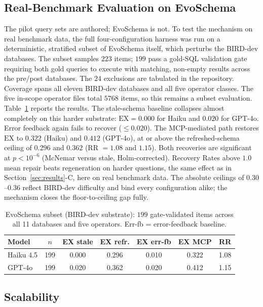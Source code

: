 \documentclass[conference,10pt,a4paper]{IEEEtran}
\begin{document}
\subsection{Real-Benchmark Evaluation on EvoSchema}
\label{sec:evoschema}
The pilot query sets are authored; EvoSchema is not. To test the
mechanism on real benchmark data, the full four-configuration harness
was run on a deterministic, stratified subset of EvoSchema itself,
which perturbs the BIRD-dev databases. The subset samples $223$ items;
$199$ pass a gold-SQL validation gate requiring both gold queries to
execute with matching, non-empty results across the pre/post
databases. The $24$ exclusions are tabulated in the repository.
Coverage spans all eleven BIRD-dev databases and all five operator
classes. The five in-scope operator files total $5768$ items, so this
remains a subset evaluation. Table~\ref{tab:evoschema} reports the
results. The stale-schema baseline collapses almost completely on this
harder substrate: $\text{EX} = 0.000$ for Haiku and $0.020$ for
GPT-4o. Error feedback again fails to recover ($\leq 0.020$). The
MCP-mediated path restores $\text{EX}$ to $0.322$ (Haiku) and $0.412$
(GPT-4o), at or above the refreshed-schema ceiling of $0.296$ and
$0.362$ (RR $= 1.08$ and $1.15$). Both recoveries are significant at
$p < 10^{-6}$ (McNemar versus stale, Holm-corrected). Recovery Rates
above $1.0$ mean repair beats regeneration on harder questions, the
same effect as in Section~\ref{sec:results}-C, here on real benchmark
data. The absolute ceilings of $0.30$--$0.36$ reflect BIRD-dev
difficulty and bind every configuration alike; the mechanism closes
the floor-to-ceiling gap fully.

\begin{table}[t]
\centering
\footnotesize
\caption{EvoSchema subset (BIRD-dev substrate): $199$ gate-validated
items across all 11 databases and five operators. Err-fb =
error-feedback baseline.}
\label{tab:evoschema}
\begin{tabular}{lcccccc}
\toprule
\textbf{Model} & $n$ & \textbf{EX stale} & \textbf{EX refr.} & \textbf{EX err-fb} & \textbf{EX MCP} & \textbf{RR} \\
\midrule
Haiku 4.5 & 199 & 0.000 & 0.296 & 0.010 & 0.322 & 1.08 \\
GPT-4o    & 199 & 0.020 & 0.362 & 0.020 & 0.412 & 1.15 \\
\bottomrule
\end{tabular}
\end{table}

\subsection{Scalability}
\end{document}
